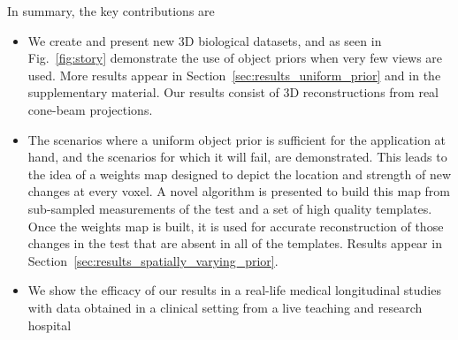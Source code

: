 \documentclass[journal]{IEEEtran}
\begin{document}
In summary, the key contributions are
\begin{itemize}
\item We create and present new 3D biological datasets, and as seen in
  Fig.~\ref{fig:story} demonstrate the use of object priors when very
  few views are used. More results appear in
  Section~\ref{sec:results_uniform_prior} and in the supplementary
  material.  Our results consist of 3D reconstructions from real
  cone-beam projections.
  \item The scenarios where a uniform object prior is sufficient for
    the application at hand, and the scenarios for which it will fail,
    are demonstrated. This leads to the idea of a weights map
    designed to depict the location and strength of new changes at
    every voxel. A novel algorithm is presented to build this map from
    sub-sampled measurements of the test and a set of high quality
    templates. Once the weights map is built, it is used for accurate
    reconstruction of those changes in the test that are absent in all
    of the templates. Results appear in
    Section~\ref{sec:results_spatially_varying_prior}.
  \item We show the efficacy of our results in a real-life medical
    longitudinal studies with data obtained in a clinical setting from
    a live teaching and
    research hospital 
 \end{itemize}

\end{document}
